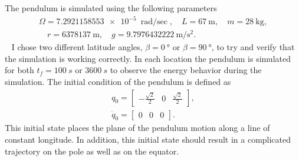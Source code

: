 \documentclass[11pt, reqno]{article}   	%
\begin{document}
The pendulum is simulated using the following parameters 
\begin{gather*}
    \Omega = \SI{7.2921158553e-5}{\radian\per\sec}, \quad L = \SI{67}{\meter}, \quad m = \SI{28}{\kilo\gram}, \\
    \quad r = \SI{6378137}{\meter}, \quad g = \SI{9.7976432222}{\meter\per\second\squared}.
\end{gather*}~
I chose two different latitude angles, \( \beta = \SI{0}{\degree} \text{ or } \beta = \SI{90}{\degree} \), to try and verify that the simulation is working correctly.
In each location the pendulum is simulated for both \( t_f = \SI{100}{s} \text{ or } \SI{3600}{s} \) to observe the energy behavior during the simulation.
The initial condition of the pendulum is defined as
\begin{align*}
    q_0 = \begin{bmatrix} -\frac{\sqrt{2}}{2} & 0 & \frac{\sqrt{2}}{2} \end{bmatrix} ,\\
    \dot{q}_0 = \begin{bmatrix}0 & 0 & 0 \end{bmatrix}.
\end{align*}
This initial state places the plane of the pendulum motion along a line of constant longitude.
In addition, this initial state should result in a complicated trajectory on the pole as well as on the equator. 
\end{document}
